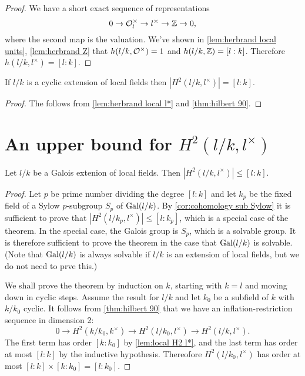 \begin{proof}
	We have a short exact sequence of representations
	\[
		0 \to {\mathcal O}_l^\times \to l^\times \to {\mathbb Z} \to 0,
 	\]
	where the second map is the valuation.
	We've shown in \ref{lem:herbrand local units}, \ref{lem:herbrand Z}
	that $h(l/k,{\mathcal O}^\times)=1$ and $h(l/k,{\mathbb Z}) = [l:k]$.
	Therefore $h(l/k,l^\times) = [l:k]$.
\end{proof}


\begin{lemma} \label{lem:local H2 l*}
	If $l/k$ is a cyclic extension of local fields then $|H^2(l/k,l^\times)| = [l:k]$.
\end{lemma}

\begin{proof}
	The follows from \ref{lem:herbrand local l*} and \ref{thm:hilbert 90}.
\end{proof}


\section{An upper bound for \texorpdfstring{$H^2(l/k,l^\times)$}{$H^2(l/k,l*)$}}

\begin{theorem} \label{lem:local H2 upper bound}
	Let $l/k$ be a Galois extenion of local fields.
	Then $|H^2(l/k,l^\times)| \le [l:k]$.
\end{theorem}

\begin{proof}
	Let $p$ be prime number dividing the degree $[l:k]$ and let $k_p$ be the fixed field
	of a Sylow $p$-subgroup $S_p$ of $\mathrm{Gal}(l/k)$.
	By \ref{cor:cohomology sub Sylow} it is sufficient to prove that
	$|H^2(l/k_p,l^\times)| \le [l:k_p]$, which is a special case of the theorem.
	In the special case, the Galois group is $S_p$, which is a solvable group.
	It is therefore sufficient to prove the theorem in the case that $\mathrm{Gal}(l/k)$ is solvable.
	(Note that $\mathrm{Gal}(l/k)$ is always solvable if $l/k$ is an extension of local fields,
	but we do not need to prve this.)

	We shall prove the theorem by induction on $k$, starting with $k=l$ and moving down in
	cyclic steps. Assume the result for $l/k$ and let $k_0$ be a subfield of $k$ with $k/k_0$ cyclic.
	It follows from \ref{thm:hilbert 90} that
	we have an inflation-restriction sequence in dimension 2:
	\[
		0 \to H^2(k/k_0, k^\times) \to H^2( l/k_0, l^\times) \to H^2(l/k, l^\times).
	\]
	The first term has order $[k : k_0]$ by \ref{lem:local H2 l*}, and the last term has
	order at most $[l:k]$ by the inductive hypothesis.
	Thereofore $H^2( l/k_0, l^\times)$ has order at most $[l:k] \times [k : k_0] = [l: k_0]$.
\end{proof}








